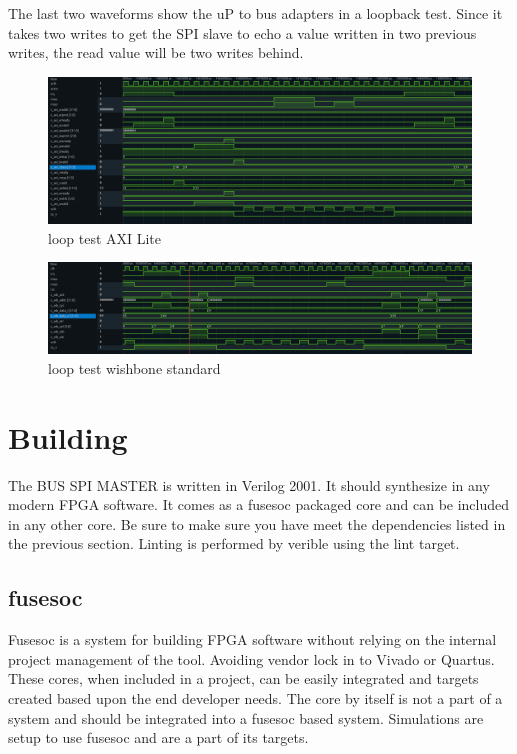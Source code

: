 \par
The last two waveforms show the uP to bus adapters in a loopback test. Since it takes two writes to get the SPI slave to
echo a value written in two previous writes, the read value will be two writes behind.
\begin{figure}[H]
\caption{loop test AXI Lite}
\centering
\includegraphics[width=\textwidth]{img/diagrams/waveform_loop_test_axil.png}
\end{figure}

\begin{figure}[H]
\caption{loop test wishbone standard}
\centering
\includegraphics[width=\textwidth]{img/diagrams/waveform_loop_test_wishbone_standard.png}
\end{figure}

\section{Building}

\par
The BUS SPI MASTER is written in Verilog 2001. It should synthesize in any modern FPGA software. It comes as a fusesoc packaged core and can be included in any other core. Be sure to make sure you have meet the dependencies listed in the previous section. Linting is performed by verible using the lint target.

\subsection{fusesoc}
\par
Fusesoc is a system for building FPGA software without relying on the internal project management of the tool. Avoiding vendor lock in to Vivado or Quartus.
These cores, when included in a project, can be easily integrated and targets created based upon the end developer needs. The core by itself is not a part of
a system and should be integrated into a fusesoc based system. Simulations are setup to use fusesoc and are a part of its targets.

